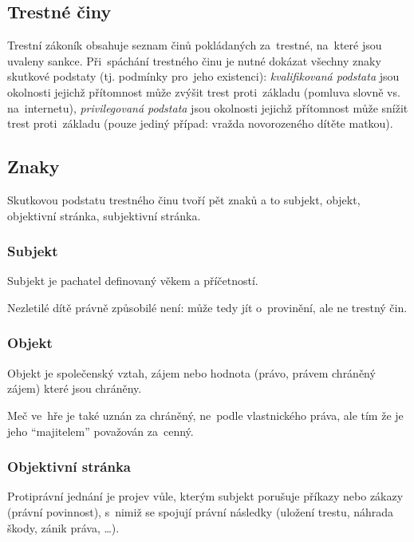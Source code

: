 \subsection{Trestné činy}

Trestní zákoník obsahuje seznam činů pokládaných za~trestné, na~které jsou uvaleny sankce.
Při~spáchání trestného činu je nutné dokázat všechny znaky skutkové podstaty (tj. podmínky pro~jeho existenci):
\emph{kvalifikovaná podstata} jsou okolnosti jejichž přítomnost může zvýšit trest proti~základu (pomluva slovně vs. na~internetu),
\emph{privilegovaná podstata} jsou okolnosti jejichž přítomnost může snížit trest proti~základu (pouze jediný případ: vražda novorozeného dítěte matkou).

\subsection{Znaky}

Skutkovou podstatu trestného činu tvoří pět znaků a to subjekt, objekt, objektivní stránka, subjektivní stránka.

\subsubsection{Subjekt}

Subjekt je pachatel definovaný věkem a příčetností.

Nezletilé dítě právně způsobilé není: může tedy jít o~provinění, ale ne trestný čin.


\subsubsection{Objekt}

Objekt je společenský vztah, zájem nebo hodnota (právo, právem chráněný zájem) které jsou chráněny.

Meč ve~hře je také uznán za chráněný, ne~podle vlastnického práva, ale tím že je jeho \enquote{majitelem} považován za~cenný.


\subsubsection{Objektivní stránka}

Protiprávní jednání je projev vůle, kterým subjekt porušuje příkazy nebo zákazy (právní povinnost), s~nimiž se spojují právní následky (uložení trestu, náhrada škody, zánik práva, \dots).

